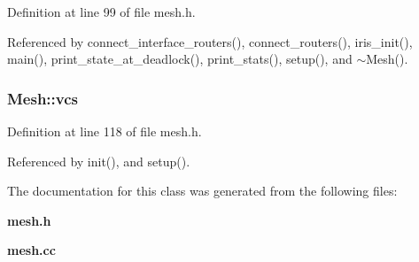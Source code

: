 Definition at line 99 of file mesh.h.

Referenced by connect\_\-interface\_\-routers(), connect\_\-routers(), iris\_\-init(), main(), print\_\-state\_\-at\_\-deadlock(), print\_\-stats(), setup(), and $\sim$Mesh().
\subsubsection[{vcs}]{ {\bf Mesh::vcs}\hspace{0.3cm}{\tt  [private]}}\label{classMesh_043374c0f6e25837894c5e24fd3aa57f}




Definition at line 118 of file mesh.h.

Referenced by init(), and setup().

The documentation for this class was generated from the following files:\begin{CompactItemize}
\item 
{\bf mesh.h}\item 
{\bf mesh.cc}\end{CompactItemize}
